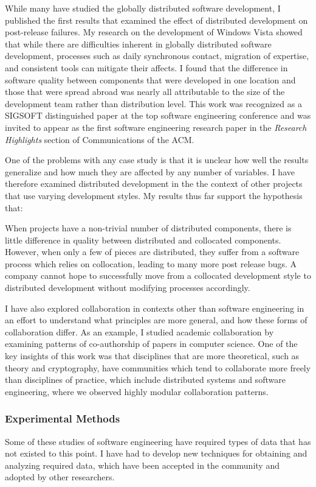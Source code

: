 \documentclass[10pt]{article}
\newcommand\Subsection[1]{\subsubsection*{\small #1}}
\begin{document}
\begin{small}
While many have studied the globally distributed software development, I
published the first results that examined the effect of distributed development
on post-release failures.  My research on the development of Windows Vista
showed that while there are difficulties inherent in globally distributed
software development, processes such as daily synchronous contact, migration of
expertise, and consistent tools can mitigate their affects.  I found that the
difference in software quality between components that were developed in one
location and those that were spread abroad was nearly all attributable to the
size of the development team rather than distribution level.  This work was
recognized as a SIGSOFT distinguished paper at the top software engineering
conference and was invited to appear as the first software engineering research
paper in the \emph{Research Highlights} section of Communications of the ACM.

One of the problems with any case study is that it is unclear how well the
results generalize and how much they are affected by any number of variables.
I have therefore examined distributed development in the the context of other
projects that use varying development styles.  My results thus far support
the hypothesis that:

When projects have a non-trivial number of distributed components, there is
little difference in quality between distributed and collocated components.
However, when only a few of pieces are distributed, they suffer from a software
process which relies on collocation, leading to many more post release bugs.  A
company cannot hope to successfully move from a collocated development style to
distributed development without modifying processes accordingly.

I have also explored collaboration in contexts other than software engineering
in an effort to understand what principles are more general, and how these forms of
collaboration differ.  As an example, I studied academic collaboration by
examining patterns of co-authorship of papers in computer science.  One of the
key insights of this work was that disciplines that are more theoretical, such
as theory and cryptography, have communities which tend to collaborate more
freely than disciplines of practice, which include distributed systems and
software engineering, where we observed highly modular collaboration patterns.

\Subsection{Experimental Methods}

Some of these studies of software engineering have required types of data that
has not existed to this point. I have had to develop new techniques for
obtaining and analyzing required data, which have been accepted in the
community and adopted by other researchers.


\end{small}
\end{document}
